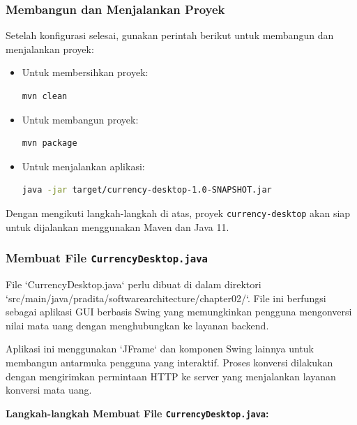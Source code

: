 \subsubsection{Membangun dan Menjalankan Proyek}
Setelah konfigurasi selesai, gunakan perintah berikut untuk membangun dan menjalankan proyek:

\begin{itemize}
\item Untuk membersihkan proyek:
\begin{lstlisting}[language=bash]
mvn clean
\end{lstlisting}

\item Untuk membangun proyek:
\begin{lstlisting}[language=bash]
mvn package
\end{lstlisting}

\item Untuk menjalankan aplikasi:
\begin{lstlisting}[language=bash]
java -jar target/currency-desktop-1.0-SNAPSHOT.jar
\end{lstlisting}
\end{itemize}

Dengan mengikuti langkah-langkah di atas, proyek \texttt{currency-desktop} akan siap untuk dijalankan menggunakan Maven dan Java 11.

\subsubsection{Membuat File \texttt{CurrencyDesktop.java}}
File `CurrencyDesktop.java` perlu dibuat di dalam direktori `src/main/java/pradita/softwarearchitecture/chapter02/`. File ini berfungsi sebagai aplikasi GUI berbasis Swing yang memungkinkan pengguna mengonversi nilai mata uang dengan menghubungkan ke layanan backend.

Aplikasi ini menggunakan `JFrame` dan komponen Swing lainnya untuk membangun antarmuka pengguna yang interaktif. Proses konversi dilakukan dengan mengirimkan permintaan HTTP ke server yang menjalankan layanan konversi mata uang.

\textbf{Langkah-langkah Membuat File \texttt{CurrencyDesktop.java}:}

